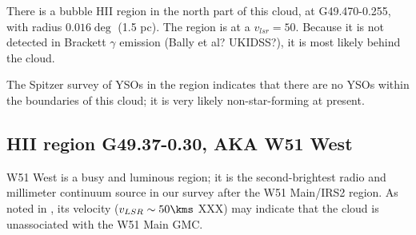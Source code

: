 There is a bubble HII region in the north part of this cloud, at G49.470-0.255,
with radius $0.016\deg$ (1.5 pc).  The \hii region is at a $v_{lsr}=50$\kms.
Because it is not detected in Brackett $\gamma$ emission (Bally et al?
UKIDSS?), it is most likely behind the cloud.

The \citet{Kang2009a} Spitzer survey of YSOs in the region indicates that there
are no YSOs within the boundaries of this cloud; it is very likely
non-star-forming at present.

\subsection{HII region G49.37-0.30, AKA W51 West}
W51 West is a busy and luminous \hii region; it is the second-brightest radio
and millimeter continuum source in our survey after the W51 Main/IRS2 region.
As noted in \citet{Carpenter1998a}, its velocity ($v_{LSR}\sim 50\kms$ XXX) 
may indicate that the cloud is unassociated with the W51 Main GMC.



